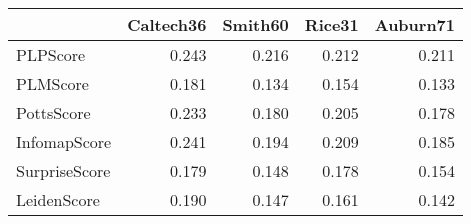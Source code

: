 \begin{tabular}{lrrrr}
\toprule
{} & Caltech36 & Smith60 & Rice31 & Auburn71 \\
\midrule
PLPScore      &     0.243 &   0.216 &  0.212 &    0.211 \\
PLMScore      &     0.181 &   0.134 &  0.154 &    0.133 \\
PottsScore    &     0.233 &   0.180 &  0.205 &    0.178 \\
InfomapScore  &     0.241 &   0.194 &  0.209 &    0.185 \\
SurpriseScore &     0.179 &   0.148 &  0.178 &    0.154 \\
LeidenScore   &     0.190 &   0.147 &  0.161 &    0.142 \\
\bottomrule
\end{tabular}
